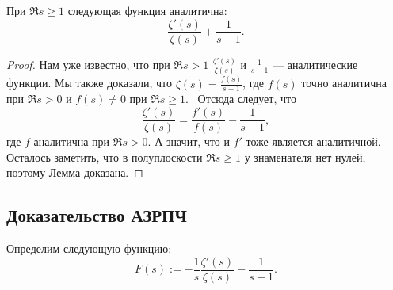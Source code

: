 \begin{nlemma}
\label{lm:I-10}
    При $\Re{s} \ge 1$ следующая функция аналитична:
    \[
        \frac{\zeta'(s)}{\zeta(s)} + \frac{1}{s-1}.
    \]
\end{nlemma}
\begin{proof}
    Нам уже известно, что при $\Re{s} > 1$ $\frac{\zeta'(s)}{\zeta(s)}$ и $\frac{1}{s-1}$ --- аналитические функции. Мы также доказали, что $\zeta(s) = \frac{f(s)}{s-1}$, где $f(s)$ точно аналитична при $\Re{s} > 0$ и $f(s) \ne 0$ при $\Re{s} \ge 1$.~\newline
    Отсюда следует, что 
    \[
        \frac{\zeta'(s)}{\zeta(s)} = \frac{f'(s)}{f(s)} - \frac{1}{s-1},
    \]
    где $f$ аналитична при $\Re{s} > 0$. А значит, что и $f'$ тоже является аналитичной. Осталось заметить, что в полуплоскости $\Re{s} \ge 1$ у знаменателя нет нулей, поэтому Лемма доказана.
\end{proof}


\subsection{Доказательство АЗРПЧ}
\label{subsec:5_Prime-number-theorem-proof}

\begin{ndefinition}
\label{def:I_F-function}
    Определим следующую функцию:
    \[
        F(s) := -\frac{1}{s}\frac{\zeta'(s)}{\zeta(s)} - \frac{1}{s-1}.
    \]
\end{ndefinition}

